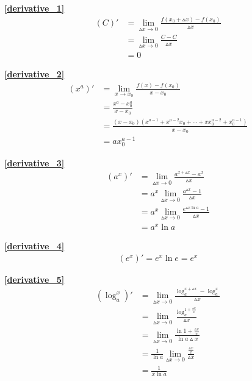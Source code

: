 \textbf{\large \ref{derivative_1}}
\begin{align*}
        (C)'&=\lim\limits_{\vartriangle x\to 0}\frac{f(x_0+\vartriangle x)-f(x_0)}{\vartriangle x}\\
        &=\lim\limits_{\vartriangle x\to 0} \frac{C-C}{\vartriangle x}\\
        &=0
\end{align*}

\textbf{\large \ref{derivative_2}}
\begin{align*}
        \left(x^a\right)'&=\lim\limits_{x\to x_0}\frac{f(x)-f(x_0)}{x-x_0}\\
        &=\frac{x^a-x_0^a}{x-x_0}\\
        &=\frac{(x-x_0)\left(x^{a-1}+x^{a-2}x_0+\cdots+xx_0^{a-2}+x_0^{a-1}\right)}{x-x_0}\\
        &=ax_0^{a-1}
\end{align*}

\textbf{\large \ref{derivative_3}}
\begin{align*}
        \left(a^x\right)'&=\lim\limits_{\vartriangle x\to 0}\frac{a^{x+\vartriangle x}-a^x}{\vartriangle x}\\
        &=a^x\lim\limits_{\vartriangle x\to 0}\frac{a^{\vartriangle x}-1}{\vartriangle x}\\
        &=a^x\lim\limits_{\vartriangle x\to 0}\frac{e^{\vartriangle x \ln a}-1}{\vartriangle x}\\
        &=a^x\ln a
\end{align*}

\textbf{\large \ref{derivative_4}}
\begin{align*}
        \left(e^x\right)'=e^x\ln e=e^x
\end{align*}

\textbf{\large \ref{derivative_5}}
\begin{align*}
        \left(\log_a^x\right)'&=\lim\limits_{\vartriangle x\to 0}\frac{\log_a^{x+\vartriangle x}-\log_a^x}{\vartriangle x}\\
        &=\lim\limits_{\vartriangle x\to 0}\frac{\log_a^{1+\frac{\vartriangle x}{x}}}{\vartriangle x}\\
        &=\lim\limits_{\vartriangle x\to 0}\frac{\ln{1+\frac{\vartriangle x}{x}}}{\ln a\vartriangle x}\\
        &=\frac{1}{\ln a}\lim\limits_{\vartriangle x\to 0}\frac{\frac{\vartriangle x}{x}}{\vartriangle x}\\
        &=\frac{1}{x\ln a}
\end{align*}

